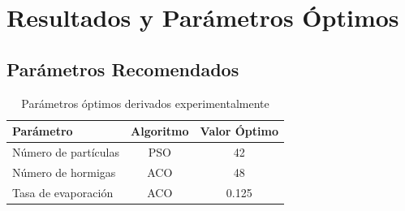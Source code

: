 \documentclass{article}
\begin{document}
\section{Resultados y Parámetros Óptimos}

\subsection{Parámetros Recomendados}
\begin{table}[h]
\centering
\begin{tabular}{lcc}
\toprule
\textbf{Parámetro} & \textbf{Algoritmo} & \textbf{Valor Óptimo} \\
\midrule
Número de partículas & PSO & 42 \\
Número de hormigas & ACO & 48 \\
Tasa de evaporación & ACO & 0.125 \\
\bottomrule
\end{tabular}
\caption{Parámetros óptimos derivados experimentalmente}
\end{table}
\end{document}
